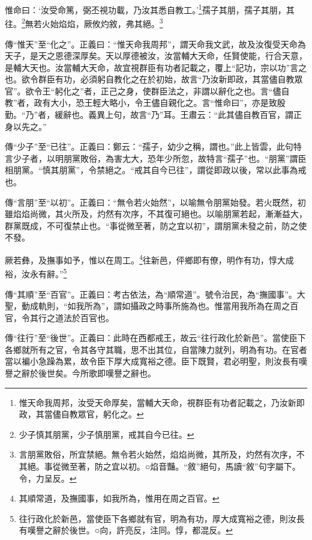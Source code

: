 惟命曰：‘汝受命篤，弼丕視功載，乃汝其悉自教工。’\footnote{惟天命我周邦，汝受天命厚矣，當輔大天命，視群臣有功者記載之，乃汝新即政，其當儘自教眾官，躬化之。}孺子其朋，孺子其朋，其往。\footnote{少子慎其朋黨，少子慎朋黨，戒其自今已往。}無若火始焰焰，厥攸灼敘，弗其絕。\footnote{言朋黨敗俗，所宜禁絕。無令若火始然，焰焰尚微，其所及，灼然有次序，不其絕。事從微至著，防之宜以初。○焰音豔。“敘”絕句，馬讀“敘”句字屬下。令，力呈反。}


{\noindent\zhuan{}\fzbyks 傳“惟天”至“化之”。正義曰：“惟天命我周邦”，謂天命我文武，故及汝復受天命為天子，是天之恩德深厚矣。天以厚德被汝，汝當輔大天命，任賢使能，行合天意，是輔大天也。汝當輔大天命，故宜視群臣有功者記載之，覆上“記功，宗以功”言之也。欲令群臣有功，必須躬自教化之在於初始，故言“乃汝新即政，其當儘自教眾官”。欲令王“躬化之”者，正己之身，使群臣法之，非謂以辭化之也。言“儘自教”者，政有大小，恐王輕大略小，令王儘自親化之。言“惟命曰”，亦是致殷勤。“乃”者，緩辭也。義異上句，故言“乃”耳。王肅云：“此其儘自教百官，謂正身以先之。” \par}

{\noindent\zhuan{}\fzbyks 傳“少子”至“已往”。正義曰：鄭云：“孺子，幼少之稱，謂也。”此上皆雲，此句特言少子者，以明朋黨敗俗，為害尢大，恐年少所忽，故特言“孺子”也。“朋黨”謂臣相朋黨。“慎其朋黨”，令禁絕之。“戒其自今已往”，謂從即政以後，常以此事為戒也。 \par}

{\noindent\zhuan{}\fzbyks 傳“言朋”至“以初”。正義曰：“無令若火始然”，以喻無令朋黨始發。若火既然，初雖焰焰尚微，其火所及，灼然有次序，不其復可絕也。以喻朋黨若起，漸漸益大，群黨既成，不可復禁止也。“事從微至著，防之宜以初”，謂朋黨未發之前，防之使不發。 \par}

厥若彝，及撫事如予，惟以在周工。\footnote{其順常道，及撫國事，如我所為，惟用在周之百官。}往新邑，伻鄉即有僚，明作有功，惇大成裕，汝永有辭。”\footnote{往行政化於新邑，當使臣下各鄉就有官，明為有功，厚大成寬裕之德，則汝長有嘆譽之辭於後世。○向，許亮反，注同。惇，都混反。}

{\noindent\zhuan{}\fzbyks 傳“其順”至“百官”。正義曰：考古依法，為“順常道”。號令治民，為“撫國事”。大聖，動成軌則，“如我所為”，謂如攝政之時事所施為也。惟當用我所為在周之百官，令其行之道法於百官也。 \par}

{\noindent\zhuan{}\fzbyks 傳“往行”至“後世”。正義曰：此時在西都戒王，故云“往行政化於新邑”。當使臣下各鄉就所有之官，令其各守其職，思不出其位，自當陳力就列，明為有功。在官者當以褊小急躁為累，故令臣下厚大成寬裕之德。臣下既賢，君必明聖，則汝長有嘆譽之辭於後世矣。今所歌即嘆譽之辭也。 \par}

